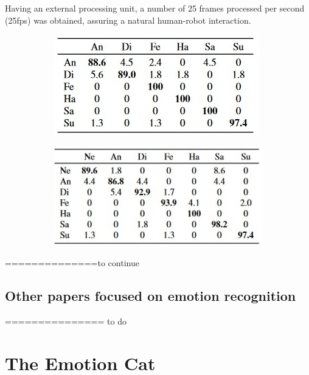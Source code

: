 \documentclass[runningheads,a4paper,12pt]{report}
\begin{document}
Having an external processing unit, a number of 25 frames processed per second (25fps) was obtained, assuring a natural human-robot interaction.
\begin{figure}
	\centering

  \begin{subfigure}{.45\textwidth}
  	\centering
  	\includegraphics[width=\linewidth]{./images/2_ck1}
  	\caption{}
  	\label{fig:ck1}
  \end{subfigure} 
  \hfill  
  \begin{subfigure}{.45\textwidth}
  	\centering
  	\includegraphics[width=\linewidth]{./images/2_ck2}
  	\caption{}
  	\label{fig:ck2}
  \end{subfigure} 
\end{figure}

==============to continue 

\section{Other papers focused on emotion recognition}

=============== to do

\chapter{The Emotion Cat}
\label{chapter:robot}
\end{document}
